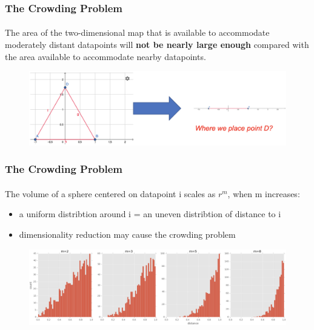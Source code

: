 \documentclass{beamer}
\begin{document}
% 
% 
% 
% 
% 
% 
\begin{frame}
  \frametitle{The Crowding Problem}
  \framesubtitle{}

The area of the two-dimensional map that is available to accommodate moderately distant datapoints will \textbf{not be nearly large enough} compared with the area available to accommodate nearby datapoints.

    \begin{figure}
        \centering
        \includegraphics[height=0.3\textheight]{images/figure1.png}
    \end{figure}
\end{frame}

\begin{frame}
    \frametitle{The Crowding Problem}
    \framesubtitle{}
    
    The volume of a sphere centered on datapoint i scales as $r^{m}$, when m increases: 
    \begin{itemize}
        \item a uniform distribtion around i = an uneven distribtion of distance to i
        \item dimensionality reduction may cause the crowding problem
    \end{itemize}
    \begin{figure}
        \centering
        \includegraphics[height=0.3\textheight]{images/figure5.png}
    \end{figure}
\end{frame}
\end{document}
